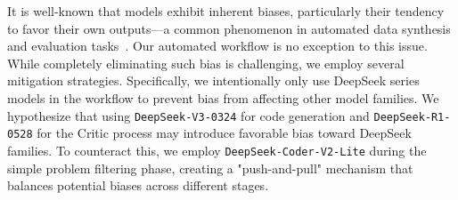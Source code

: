 \begin{table}[]
\caption{The average pass@1 scores and rankings of models at different stages.}
\label{exp:bias}
\end{table}




It is well-known that models exhibit inherent biases, particularly their tendency to favor their own outputs—a common phenomenon in automated data synthesis and evaluation tasks~\citep{panickssery2024llm,chen2025llmevaluatorspreferreason}. Our automated workflow is no exception to this issue. While completely eliminating such bias is challenging, we employ several mitigation strategies. Specifically, we intentionally only use DeepSeek series models in the workflow to prevent bias from affecting other model families. We hypothesize that using \texttt{DeepSeek-V3-0324} for code generation and \texttt{DeepSeek-R1-0528} for the Critic process may introduce favorable bias toward DeepSeek families. To counteract this, we employ \texttt{DeepSeek-Coder-V2-Lite} during the simple problem filtering phase, creating a "push-and-pull" mechanism that balances potential biases across different stages.

